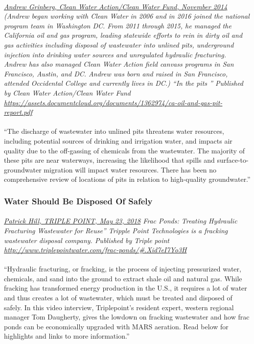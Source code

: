 \documentclass{article}
\begin{document}
\paragraph{}
\small
\textit{  
\underline{Andrew Grinberg, Clean Water Action/Clean Water Fund, November 2014}
  (Andrew began working with Clean Water in 2006 and in 2016 joined the national program team in Washington DC. From 2011 through 2015, he managed the California oil and gas program, leading statewide efforts to rein in dirty oil and gas activities including disposal of wastewater into unlined pits, underground injection into drinking water sources and unregulated hydraulic fracturing. Andrew has also managed Clean Water Action field canvass programs in San Francisco, Austin, and DC. Andrew was born and raised in San Francisco, attended Occidental College and currently lives in DC.) “In the pits ” Published by Clean Water Action/Clean Water Fund 
\url{https://assets.documentcloud.org/documents/1362974/ca-oil-and-gas-pit-report.pdf} }
\normalsize
\paragraph{}
``The discharge of wastewater into unlined pits threatens water resources, including potential sources of drinking and irrigation water, and impacts air quality due to the off-gassing of chemicals from the wastewater. The majority of these pits are near waterways, increasing the likelihood that spills and surface-to-groundwater migration will impact water resources. There has been no comprehensive review of locations of pits in relation to high-quality groundwater.''

\subsubsection{Water Should Be Disposed Of Safely}
\paragraph{}
\small
\textit{
\underline{Patrick Hill, TRIPLE POINT, May 23, 2018}
Frac Ponds: Treating Hydraulic Fracturing Wastewater for Reuse” Tripple Point Technologies is a fracking wastewater disposal company. Published by Triple point 
\url{http://www.triplepointwater.com/frac-ponds/\#.Xid7eI7Yo3H}}
\normalsize

\paragraph{}
``Hydraulic fracturing, or fracking, is the process of injecting pressurized water, chemicals, and sand into the ground to extract shale oil and natural gas. While fracking has transformed energy production in the U.S., it requires a lot of water and thus creates a lot of wastewater, which must be treated and disposed of safely. In this video interview, Triplepoint’s resident expert, western regional manager Tom Daugherty, gives the lowdown on fracking wastewater and how frac ponds can be economically upgraded with MARS aeration. Read below for highlights and links to more information.''
\end{document}

